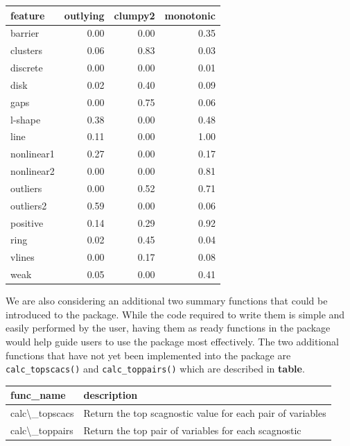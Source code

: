 \begin{Schunk}

\begin{tabular}{l|r|r|r}
\hline
feature & outlying & clumpy2 & monotonic\\
\hline
barrier & 0.00 & 0.00 & 0.35\\
\hline
clusters & 0.06 & 0.83 & 0.03\\
\hline
discrete & 0.00 & 0.00 & 0.01\\
\hline
disk & 0.02 & 0.40 & 0.09\\
\hline
gaps & 0.00 & 0.75 & 0.06\\
\hline
l-shape & 0.38 & 0.00 & 0.48\\
\hline
line & 0.11 & 0.00 & 1.00\\
\hline
nonlinear1 & 0.27 & 0.00 & 0.17\\
\hline
nonlinear2 & 0.00 & 0.00 & 0.81\\
\hline
outliers & 0.00 & 0.52 & 0.71\\
\hline
outliers2 & 0.59 & 0.00 & 0.06\\
\hline
positive & 0.14 & 0.29 & 0.92\\
\hline
ring & 0.02 & 0.45 & 0.04\\
\hline
vlines & 0.00 & 0.17 & 0.08\\
\hline
weak & 0.05 & 0.00 & 0.41\\
\hline
\end{tabular}

\end{Schunk}

We are also considering an additional two summary functions that could
be introduced to the package. While the code required to write them is
simple and easily performed by the user, having them as ready functions
in the package would help guide users to use the package most
effectively. The two additional functions that have not yet been
implemented into the package are \texttt{calc\_topscacs()} and
\texttt{calc\_toppairs()} which are described in \textbf{table}.

\begin{Schunk}

\begin{tabular}{l|l}
\hline
func\_name & description\\
\hline
calc\textbackslash{}\_topscacs & Return the top scagnostic value for each pair of variables\\
\hline
calc\textbackslash{}\_toppairs & Return the top pair of variables for each scagnostic\\
\hline
\end{tabular}

\end{Schunk}

